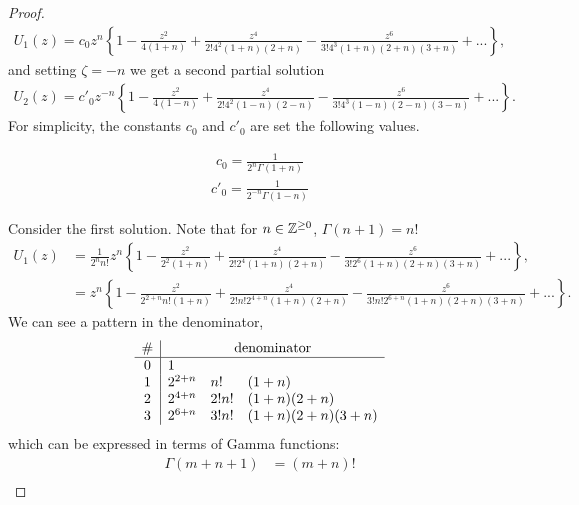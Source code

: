 \begin{proof}
    \begin{align*}
      U_1(z) = c_0z^n \left\{
        1 - \frac{z^2}{4(1+n)} + \frac{z^4}{2!4^2(1+n) (2+n)} - \frac{z^6}{3!4^3(1+n)(2+n)(3+n)} + ...
        \right\},
    \end{align*}
  and setting $\zeta = -n$ we get a second partial solution
    \begin{align*}
      U_2(z) = c'_0z^{-n} \left\{
        1 - \frac{z^2}{4(1-n)} + \frac{z^4}{2!4^2(1-n) (2-n)} - \frac{z^6}{3!4^3(1-n)(2-n)(3-n)} + ...
        \right\}.
    \end{align*}
  For simplicity, the constants $c_0$ and $c'_0$ are set the following values.
  \begin{multicols}{2}
    \noindent
    \begin{align*}
      c_0 = \frac{1}{2^n \Gamma(1+n)}
    \end{align*}
    \begin{align*}
      c'_0 = \frac{1}{2^{-n} \Gamma(1-n)}
    \end{align*}
  \end{multicols}\par
  Consider the first solution. Note that for $n \in \mathbb{Z}^{\geq0}$, $\Gamma (n+1) =n!$
  \begin{align*}
    U_1(z) &= \frac{1}{2^n n!} z^n \left\{
        1 - \frac{z^2}{2^2(1+n)} + \frac{z^4}{2!2^4(1+n) (2+n)} - \frac{z^6}{3!2^6(1+n)(2+n)(3+n)} + ...
        \right\},\\
      &= z^n \left\{
        1 - \frac{z^2}{2^{2+n} n!(1+n)} + \frac{z^4}{2!n! 2^{4+n} (1+n) (2+n)} - \frac{z^6}{3!n! 2^{6+n} (1+n) (2+n) (3+n)} + ...
        \right\}.
  \end{align*}
  We can see a pattern in the denominator,
  \begin{align*}
    \begin{array}{c|lll}
      \# &  \multicolumn{3}{c}{\text{denominator}}\\
      \hline
      0   &   1                                        \\
      1   &   2^{2+n} &   n!    &   (1+n)              \\
      2   &   2^{4+n} &   2!n!  &   (1+n) (2+n)        \\
      3   &   2^{6+n} &   3!n!  &   (1+n) (2+n) (3+n)
    \end{array}
  \end{align*}
  which can be expressed in terms of Gamma functions:
  \begin{align*}
    \Gamma(m+n+1) &= (m+n)! \\

\end{align*}
\end{proof}
